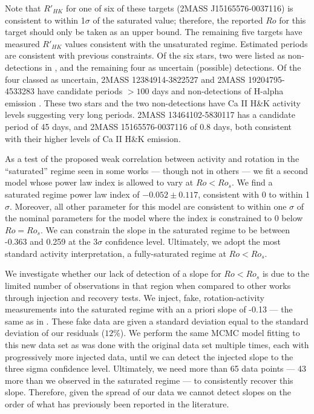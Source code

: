 Note that $R'_{HK}$ for one of six of these targets (2MASS
J15165576-0037116) is consistent to within 1$\sigma$ of the saturated value;
therefore, the reported $Ro$ for this target should only be taken as an upper
bound. The remaining five targets have measured $R'_{HK}$ values consistent
with the unsaturated regime. Estimated periods are consistent with previous
constraints. Of the six stars, two were listed as non-detections in
\citet{Newton2018}, and the remaining four as uncertain (possible) detections.
Of the four classed as uncertain, 2MASS 12384914-3822527 and 2MASS
19204795-4533283 have candidate periods $>100$ days and non-detections of
H-alpha emission \citep{Hawley96}. These two stars and the two non-detections
have Ca II H\&K activity levels suggesting very long periods. 2MASS
13464102-5830117 has a candidate period of 45 days, and 2MASS 15165576-0037116
of 0.8 days, both consistent with their higher levels of Ca II H\&K emission.

As a test of the proposed weak correlation between activity and rotation in the
``saturated'' regime seen in some works \citep{Mamajek2008,
Reiners2014, Leh20, Med20} --- though not in others \citep{Wri11, Nunez2015,
Newton2017} ---   we fit a second model whose power law index is allowed to
vary at $Ro < Ro_{s}$. We find a saturated regime power law index of
$-0.052\pm0.117$, consistent with 0 to within 1$\sigma$. Moreover,
all other parameter for this model are consistent to within one $\sigma$ of the
nominal  parameters for the model where the index is constrained to 0 below
$Ro=Ro_{s}$. We can constrain the slope in the saturated
regime to be between -0.363 and 0.259 at the $3\sigma$ confidence level.
Ultimately, we adopt the most standard activity interpretation, a
fully-saturated regime at $Ro < Ro_{s}$. 

We investigate whether our lack of detection of a slope for $Ro <
Ro_{s}$ is due to the limited number of observations in that region when
compared to other works \citep[e.g.][93 targets $Ro < Ro_{s}$]{Med20} through
injection and recovery tests. We inject, fake, rotation-activity measurements
into the saturated regime with an a priori slope of -0.13 --- the same as in
\citeauthor{Med20}. These fake data are given a standard deviation equal to the
standard deviation of our residuals ($12\%$). We perform the same MCMC model
fitting to this new data set as was done with the original data set multiple
times, each with progressively more injected data, until we can detect the
injected slope to the three sigma confidence level. Ultimately, we need more
than 65 data points --- 43 more than we observed in the saturated regime --- to
consistently recover this slope. Therefore, given the spread of our data we
cannot detect slopes on the order of what has previously been reported in the
literature.

